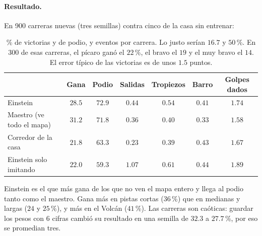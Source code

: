 \documentclass[11pt,letterpaper]{article}
\begin{document}
\paragraph{Resultado.} En 900 carreras nuevas (tres semillas) contra cinco de la casa sin entrenar:
\begin{table}[h]\centering\footnotesize
\begin{tabular}{lcccccc}
\toprule
 & Gana & Podio & Salidas & Tropiezos & Barro & Golpes dados \\
\midrule
Einstein & $28.5$ & $72.9$ & $0.44$ & $0.54$ & $0.41$ & $1.74$ \\
Maestro (ve todo el mapa) & $31.2$ & $71.8$ & $0.36$ & $0.40$ & $0.33$ & $1.58$ \\
Corredor de la casa & $21.8$ & $63.3$ & $0.23$ & $0.39$ & $0.43$ & $1.67$ \\
Einstein solo imitando & $22.0$ & $59.3$ & $1.07$ & $0.61$ & $0.44$ & $1.89$ \\
\bottomrule
\end{tabular}
\caption{\% de victorias y de podio, y eventos por carrera. Lo justo serían $16.7$ y $50$\,\%. En 300 de esas carreras, el pícaro ganó el $22$\,\%, el bravo el $19$ y el muy bravo el $14$. El error típico de las victorias es de unos $1.5$ puntos.}
\end{table}
Einstein es el que más gana de los que no ven el mapa entero y llega al podio tanto como el maestro. Gana más en pistas cortas ($36$\,\%) que en medianas y largas ($24$ y $25$\,\%), y más en el Volcán ($41$\,\%). Las carreras son caóticas: guardar los pesos con 6 cifras cambió su resultado en una semilla de $32.3$ a $27.7$\,\%, por eso se promedian tres.
\end{document}
